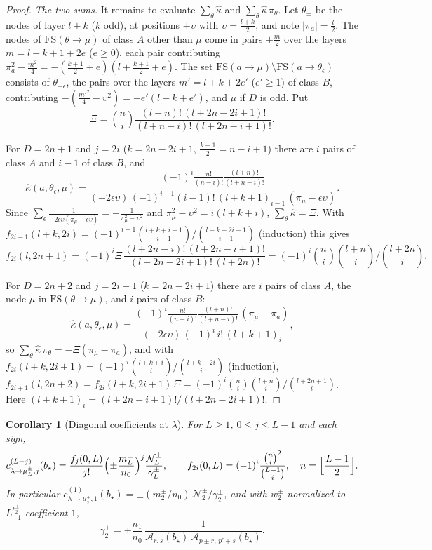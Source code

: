 \documentclass[twoside,10pt]{article}
\numberwithin{equation}{section}
\theoremstyle{slbody}
\newtheorem{corollary}[theorem]{Corollary}
\theoremstyle{definition}
\theoremstyle{remark}
\begin{document}
\begin{proof}
\emph{The two sums.}  It remains to evaluate $\sum_\theta\hat\kappa$ and
$\sum_\theta\hat\kappa\,\pi_\theta$.  Let $\theta_\pm$ be the nodes of layer
$l+k$ ($k$ odd), at positions $\pm\upsilon$ with $\upsilon=\frac{l+k}2$, and note
$|\pi_a|=\frac l2$.  The nodes of $\mathrm{FS}(\theta\to\mu)$ of class $A$
other than $\mu$ come in pairs $\pm\frac m2$ over the layers $m=l+k+1+2e$
($e\geq0$), each pair contributing
$\pi_a^2-\frac{m^2}4=-(\frac{k+1}2+e)(l+\frac{k+1}2+e)$.  The set
$\mathrm{FS}(a\to\mu)\setminus\mathrm{FS}(a\to\theta_\epsilon)$ consists of
$\theta_{-\epsilon}$, the pairs over the layers $m'=l+k+2e'$ ($e'\geq1$) of
class $B$, contributing $-(\frac{m'^2}4-\upsilon^2)=-e'(l+k+e')$, and $\mu$ if
$D$ is odd.  Put
\[
 \Xi=\binom ni\frac{(l+n)!\,(l+2n-2i+1)!}{(l+n-i)!\,(l+2n-i+1)!}.
\]

For $D=2n+1$ and $j=2i$ ($k=2n-2i+1$, $\frac{k+1}2=n-i+1$) there are $i$ pairs
of class $A$ and $i-1$ of class $B$, and
\[
 \hat\kappa(a,\theta_\epsilon,\mu)=
 \frac{(-1)^i\frac{n!}{(n-i)!}\frac{(l+n)!}{(l+n-i)!}}
 {(-2\epsilon\upsilon)\,(-1)^{i-1}(i-1)!\,(l+k+1)_{i-1}\,(\pi_\mu-\epsilon\upsilon)} .
\]
Since $\sum_\epsilon\frac1{-2\epsilon\upsilon(\pi_\mu-\epsilon\upsilon)}=-\frac1{\pi_\mu^2-\upsilon^2}$
and $\pi_\mu^2-\upsilon^2=i(l+k+i)$, $\sum_\theta\hat\kappa=\Xi$.  With
$f_{2i-1}(l+k,2i)=(-1)^{i-1}\binom{l+k+i-1}{i-1}/\binom{l+k+2i-1}{i-1}$
(induction) this gives
\[
 f_{2i}(l,2n+1)=(-1)^i\Xi\,\frac{(l+2n-i)!\,(l+2n-i+1)!}{(l+2n-2i+1)!\,(l+2n)!}
 =(-1)^i\binom ni\binom{l+n}i\Big/\binom{l+2n}i .
\]

For $D=2n+2$ and $j=2i+1$ ($k=2n-2i+1$) there are $i$ pairs of class $A$, the
node $\mu$ in $\mathrm{FS}(\theta\to\mu)$, and $i$ pairs of class $B$:
\[
 \hat\kappa(a,\theta_\epsilon,\mu)=
 \frac{(-1)^i\frac{n!}{(n-i)!}\frac{(l+n)!}{(l+n-i)!}\,(\pi_\mu-\pi_a)}
 {(-2\epsilon\upsilon)\,(-1)^i\,i!\,(l+k+1)_i},
\]
so $\sum_\theta\hat\kappa\,\pi_\theta=-\Xi(\pi_\mu-\pi_a)$, and with
$f_{2i}(l+k,2i+1)=(-1)^i\binom{l+k+i}i/\binom{l+k+2i}i$ (induction),
$f_{2i+1}(l,2n+2)=f_{2i}(l+k,2i+1)\,\Xi=(-1)^i\binom ni\binom{l+n}i/\binom{l+2n+1}i$.
Here $(l+k+1)_i=(l+2n-i+1)!/(l+2n-2i+1)!$.
\end{proof}

\begin{corollary}[Diagonal coefficients at $\lambda$]\label{cor:diagonal-lambda}
For $L\geq1$, $0\leq j\leq L-1$ and each sign,
\[
 c^{(L-j)}_{\lambda\to\mu^\pm_L,j}(b_\star)
 =\frac{f_j(0,L)}{j!}\Bigl(\pm\frac{m^\pm_L}{n_0}\Bigr)^{j}
 \frac{\mathcal N^\pm_L}{\gamma^\pm_L},\qquad
 f_{2i}(0,L)=(-1)^i\frac{\binom ni^2}{\binom{L-1}i},\quad
 n=\Bigl\lfloor\frac{L-1}2\Bigr\rfloor .
\]
In particular $c^{(1)}_{\lambda\to\mu^\pm_2,1}(b_\star)
=\pm(m^\pm_2/n_0)\,\mathcal N^\pm_2/\gamma^\pm_2$, and with $w^\pm_2$
normalized to $L_{-1}^{\ell^\pm_2}$-coefficient $1$,
\[
 \gamma^\pm_2=\mp\frac{n_1}{n_0}\,
 \frac1{{\mathcal A}_{r,s}(b_\star)\,{\mathcal A}_{p\pm r,\,p'\mp s}(b_\star)} .
\]
\end{corollary}
\end{document}
